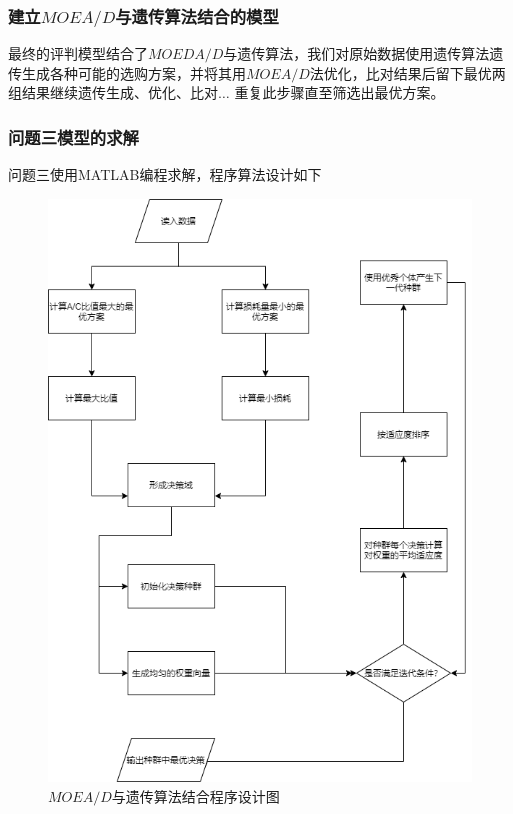 \documentclass[withoutpreface,bwprint]{cumcmthesis}
\begin{document}
\subsubsection*{建立$MOEA/D$与遗传算法结合的模型}
最终的评判模型结合了$MOEDA/D$与遗传算法，我们对原始数据使用遗传算法遗传生成各种可能的选购方案，并将其用$MOEA/D$法优化，比对结果后留下最优两组结果继续遗传生成、优化、比对$\dots$
重复此步骤直至筛选出最优方案。

\subsubsection{问题三模型的求解}
问题三使用MATLAB编程求解，程序算法设计如下
\begin{figure}[H]
    \centering
    \includegraphics[scale = 0.5]{three.png}
    \centering
    \caption{$MOEA/D$与遗传算法结合程序设计图} \label{fig:6}
\end{figure}
\end{document}
